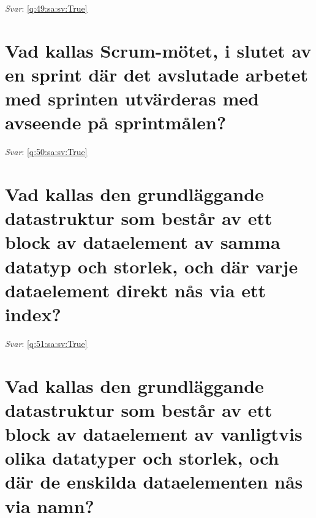 \documentclass[a4paper,11pt,oneside]{book}
\begin{document}
\begin{sloppypar}
\label{q:49:sa:sv:False}

\vspace{2cm}

\noindent\makebox[\textwidth]{\hrulefill}

\vspace{1cm}

\textit{Svar}: \autoref{q:49:sa:sv:True}



\section{Vad kallas Scrum-m\"otet, i slutet av en sprint d\"ar det avslutade arbetet med sprinten utv\"arderas med avseende p\r{a} sprintm\r{a}len?}

\label{q:50:sa:sv:False}

\vspace{2cm}

\noindent\makebox[\textwidth]{\hrulefill}

\vspace{1cm}

\textit{Svar}: \autoref{q:50:sa:sv:True}



\section{Vad kallas den grundl\"aggande datastruktur som best\r{a}r av ett block av dataelement av samma datatyp och storlek, och d\"ar varje dataelement direkt n\r{a}s via ett index?}

\label{q:51:sa:sv:False}

\vspace{2cm}

\noindent\makebox[\textwidth]{\hrulefill}

\vspace{1cm}

\textit{Svar}: \autoref{q:51:sa:sv:True}



\section{Vad kallas den grundl\"aggande datastruktur som best\r{a}r av ett block av dataelement av vanligtvis olika datatyper och storlek, och d\"ar de enskilda dataelementen n\r{a}s via namn?}

\label{q:52:sa:sv:False}

\vspace{2cm}


\end{sloppypar}
\end{document}
